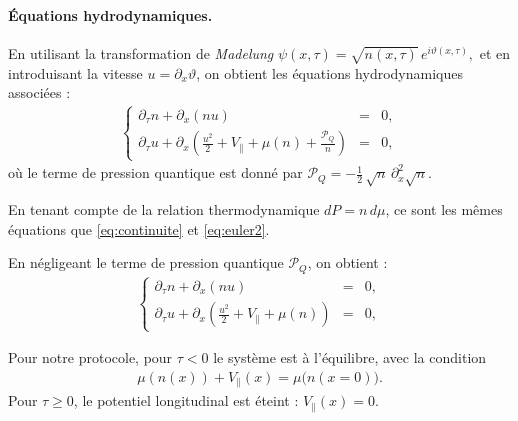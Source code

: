 \paragraph{Équations hydrodynamiques.}
En utilisant la transformation de \emph{Madelung} 
\(
\psi(x,\tau) = \sqrt{n(x,\tau)} \, e^{i \vartheta(x,\tau)},
\)
et en introduisant la vitesse \(u = \partial_x \vartheta\), on obtient les équations hydrodynamiques associées \cite{Spiegel1980FluidDF,10.1093/acprof:oso/9780198758884.001.0001} :
\begin{eqnarray}\label{chap:5:eq.hydro.1}
	\left\{
	\begin{array}{rcl}
		\partial_\tau n + \partial_x ( n u )	 & = & 0, \\[0.3em]
		\partial_\tau u + \partial_x \left( \frac{u^2}{2} + V_\parallel + \mu(n) + \frac{\mathcal{P}_Q}{n} \right) & = & 0,
	\end{array} 
	\right.
\end{eqnarray}
où le terme de pression quantique est donné par
\(
\mathcal{P}_Q  = -\frac{1}{2} \, \sqrt{n} \, \partial_x^2 \sqrt{n} .
\)

\medskip


En tenant compte de la relation thermodynamique \(dP = n \, d\mu\), ce sont les mêmes équations que \eqref{eq:continuite} et \eqref{eq:euler2}.

En négligeant le terme de pression quantique \(\mathcal{P}_Q\), on obtient :
\begin{eqnarray}\label{chap:5:eq.hydro.1.1}
	\left\{
	\begin{array}{rcl}
		\partial_\tau n + \partial_x ( n u )	 & = & 0, \\[0.3em]
		\partial_\tau u + \partial_x \left( \frac{u^2}{2} + V_\parallel + \mu(n) \right) & = & 0,
	\end{array} 
	\right.
\end{eqnarray}


\medskip

Pour notre protocole, pour $\tau < 0$ le système est à l’équilibre, avec la condition
\begin{eqnarray}
	\mu(n(x)) + V_\parallel(x) = \mu\bigl(n(x=0)\bigr).
\end{eqnarray}
Pour $\tau \geq 0$, le potentiel longitudinal est éteint : $V_\parallel(x) = 0$.

\medskip

